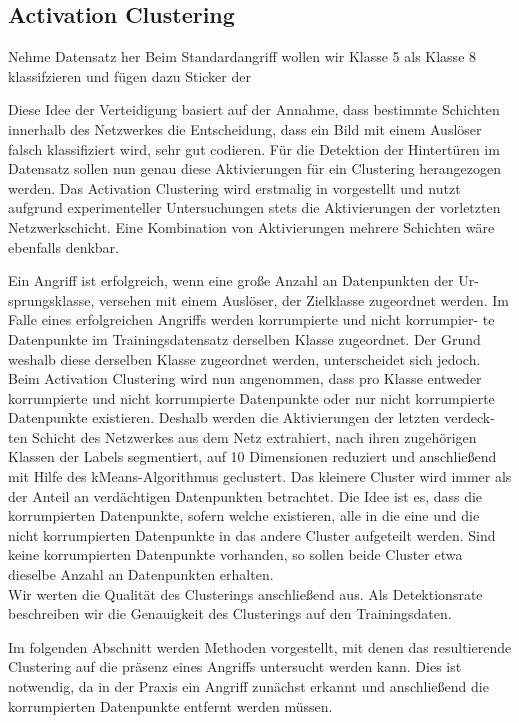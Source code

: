 \documentclass[11pt,a4paper]{article}
\numberwithin{equation}{section}
\begin{document}
	\subsection{Activation Clustering}
	
	
		Nehme Datensatz her
		Beim Standardangriff wollen wir Klasse 5 als Klasse 8 klassifzieren und fügen dazu Sticker der  
		
		
		Diese Idee der Verteidigung basiert auf der Annahme, dass bestimmte Schichten innerhalb des Netzwerkes die Entscheidung, dass ein Bild mit einem Auslöser falsch klassifiziert wird, sehr gut codieren. Für die Detektion der Hintertüren im Datensatz sollen nun genau diese Aktivierungen für ein Clustering herangezogen werden.
		Das Activation Clustering wird erstmalig in \cite{AC} vorgestellt und nutzt aufgrund experimenteller Untersuchungen stets die Aktivierungen der vorletzten Netzwerkschicht.
		Eine Kombination von Aktivierungen mehrere Schichten wäre ebenfalls denkbar.
				
		Ein Angriff ist erfolgreich, wenn eine große Anzahl an Datenpunkten der Ur-
		sprungsklasse, versehen mit einem Auslöser, der Zielklasse zugeordnet werden.
		Im Falle eines erfolgreichen Angriffs werden korrumpierte und nicht korrumpier-
		te Datenpunkte im Trainingsdatensatz derselben Klasse zugeordnet. Der Grund
		weshalb diese derselben Klasse zugeordnet werden, unterscheidet sich jedoch.
		Beim Activation Clustering wird nun angenommen, dass pro Klasse entweder
		korrumpierte und nicht korrumpierte Datenpunkte oder nur nicht korrumpierte
		Datenpunkte existieren. Deshalb werden die Aktivierungen der letzten verdeck-
		ten Schicht des Netzwerkes aus dem Netz extrahiert, nach ihren zugehörigen
		Klassen der Labels segmentiert, auf 10 Dimensionen reduziert und anschließend
		mit Hilfe des kMeans-Algorithmus geclustert. Das kleinere Cluster wird immer
		als der Anteil an verdächtigen Datenpunkten betrachtet. Die Idee ist es, dass
		die korrumpierten Datenpunkte, sofern welche existieren, alle in die eine und
		die nicht korrumpierten Datenpunkte in das andere Cluster aufgeteilt werden.
		Sind keine korrumpierten Datenpunkte vorhanden, so sollen beide Cluster etwa dieselbe Anzahl an Datenpunkten erhalten.\\
		
		Wir werten die Qualität des Clusterings anschließend aus. Als Detektionsrate
		beschreiben wir die Genauigkeit des Clusterings auf den Trainingsdaten.
		
		Im folgenden Abschnitt werden Methoden vorgestellt, mit denen das resultierende Clustering auf die präsenz eines Angriffs untersucht werden kann. Dies ist notwendig, da in der Praxis ein Angriff zunächst erkannt und anschließend die korrumpierten Datenpunkte entfernt werden müssen. 
		
\end{document}

